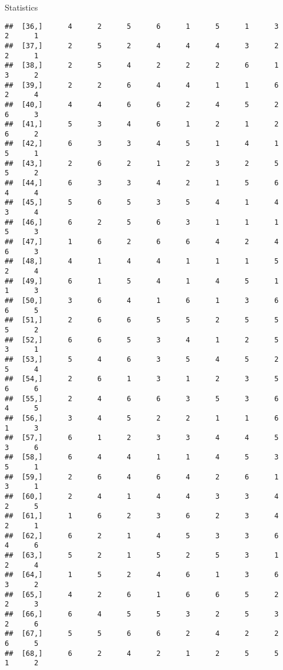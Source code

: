 \documentclass[
  ignorenonframetext,
]{beamer}
\begin{document}
\begin{frame}[fragile]{Statistics}
\begin{verbatim}
##  [36,]      4      2      5      6      1      5      1      3      2      1
##  [37,]      2      5      2      4      4      4      3      2      2      1
##  [38,]      2      5      4      2      2      2      6      1      3      2
##  [39,]      2      2      6      4      4      1      1      6      2      4
##  [40,]      4      4      6      6      2      4      5      2      6      3
##  [41,]      5      3      4      6      1      2      1      2      6      2
##  [42,]      6      3      3      4      5      1      4      1      5      1
##  [43,]      2      6      2      1      2      3      2      5      5      2
##  [44,]      6      3      3      4      2      1      5      6      4      4
##  [45,]      5      6      5      3      5      4      1      4      3      4
##  [46,]      6      2      5      6      3      1      1      1      5      3
##  [47,]      1      6      2      6      6      4      2      4      6      3
##  [48,]      4      1      4      4      1      1      1      5      2      4
##  [49,]      6      1      5      4      1      4      5      1      1      3
##  [50,]      3      6      4      1      6      1      3      6      6      5
##  [51,]      2      6      6      5      5      2      5      5      5      2
##  [52,]      6      6      5      3      4      1      2      5      3      1
##  [53,]      5      4      6      3      5      4      5      2      5      4
##  [54,]      2      6      1      3      1      2      3      5      6      6
##  [55,]      2      4      6      6      3      5      3      6      4      5
##  [56,]      3      4      5      2      2      1      1      6      1      3
##  [57,]      6      1      2      3      3      4      4      5      3      6
##  [58,]      6      4      4      1      1      4      5      3      5      1
##  [59,]      2      6      4      6      4      2      6      1      3      1
##  [60,]      2      4      1      4      4      3      3      4      2      5
##  [61,]      1      6      2      3      6      2      3      4      2      1
##  [62,]      6      2      1      4      5      3      3      6      4      6
##  [63,]      5      2      1      5      2      5      3      1      2      4
##  [64,]      1      5      2      4      6      1      3      6      3      2
##  [65,]      4      2      6      1      6      6      5      2      2      3
##  [66,]      6      4      5      5      3      2      5      3      2      6
##  [67,]      5      5      6      6      2      4      2      2      6      5
##  [68,]      6      2      4      2      1      2      5      5      1      2

\end{verbatim}
\end{frame}
\end{document}
